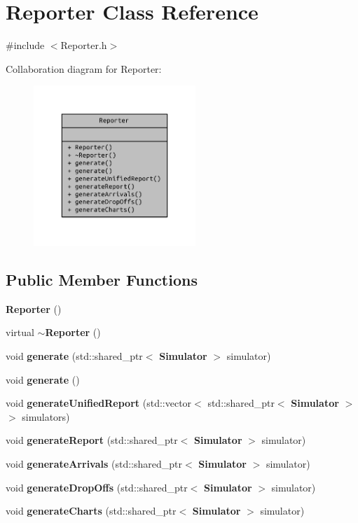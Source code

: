 \section{Reporter Class Reference}
\label{class_reporter}


{\ttfamily \#include $<$Reporter.\+h$>$}



Collaboration diagram for Reporter\+:
\nopagebreak
\begin{figure}[H]
\begin{center}
\leavevmode
\includegraphics[width=173pt]{class_reporter__coll__graph}
\end{center}
\end{figure}
\subsection*{Public Member Functions}
\begin{DoxyCompactItemize}
\item 
{\bf Reporter} ()
\item 
virtual {\bf $\sim$\+Reporter} ()
\item 
void {\bf generate} (std\+::shared\+\_\+ptr$<$ {\bf Simulator} $>$ simulator)
\item 
void {\bf generate} ()
\item 
void {\bf generate\+Unified\+Report} (std\+::vector$<$ std\+::shared\+\_\+ptr$<$ {\bf Simulator} $>$$>$ simulators)
\item 
void {\bf generate\+Report} (std\+::shared\+\_\+ptr$<$ {\bf Simulator} $>$ simulator)
\item 
void {\bf generate\+Arrivals} (std\+::shared\+\_\+ptr$<$ {\bf Simulator} $>$ simulator)
\item 
void {\bf generate\+Drop\+Offs} (std\+::shared\+\_\+ptr$<$ {\bf Simulator} $>$ simulator)
\item 
void {\bf generate\+Charts} (std\+::shared\+\_\+ptr$<$ {\bf Simulator} $>$ simulator)
\end{DoxyCompactItemize}


